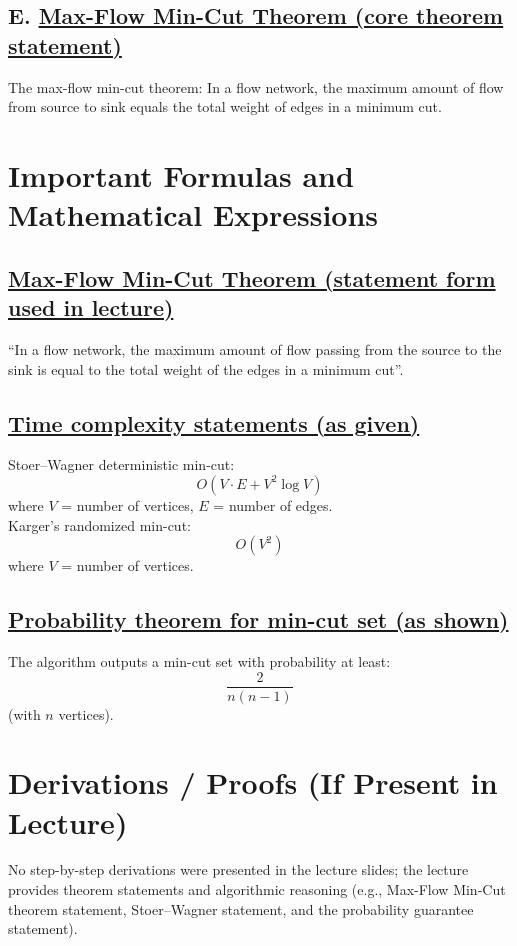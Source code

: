 \documentclass[11pt]{article}
\begin{document}
\subsection*{E. \underline{Max-Flow Min-Cut Theorem (core theorem statement)}}
The max-flow min-cut theorem: In a flow network, the maximum amount of flow from source to sink equals the total weight of edges in a minimum cut.

\vspace{1cm}
\section{Important Formulas and Mathematical Expressions}

\subsection*{\underline{Max-Flow Min-Cut Theorem (statement form used in lecture)}}
``In a flow network, the maximum amount of flow passing from the source to the sink is equal to the total weight of the edges in a minimum cut''.

\subsection*{\underline{Time complexity statements (as given)}}
Stoer--Wagner deterministic min-cut:
\[
O\!\left(V \cdot E + V^{2}\log V\right)
\]
where $V$ = number of vertices, $E$ = number of edges.\\[4pt]
Karger’s randomized min-cut:
\[
O\!\left(V^{2}\right)
\]
where $V$ = number of vertices.

\subsection*{\underline{Probability theorem for min-cut set (as shown)}}
The algorithm outputs a min-cut set with probability at least:
\[
\frac{2}{n(n-1)}
\]
(with $n$ vertices).

\vspace{1cm}
\section{Derivations / Proofs (If Present in Lecture)}
No step-by-step derivations were presented in the lecture slides; the lecture provides theorem statements and algorithmic reasoning (e.g., Max-Flow Min-Cut theorem statement, Stoer--Wagner statement, and the probability guarantee statement).
\end{document}
